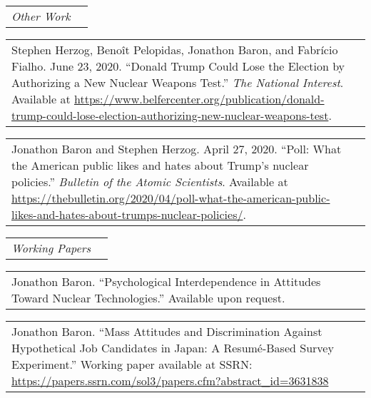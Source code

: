 \documentclass[11pt]{article}
\begin{document}
\vspace{0.13in}

\begin{tabular*}{7.1in}{p{6.925in}p{3cm}}
{\large {\emph{Other Work}}}
\end{tabular*} 
	
\vspace{0.13in}

\begin{tabular*}{7.1in}{p{6.925in}p{3cm}}
Stephen Herzog, Beno\^{i}t Pelopidas, Jonathon Baron, and Fabrício Fialho. June 23, 2020. ``Donald Trump Could Lose the Election by Authorizing a New Nuclear Weapons Test.'' \textit{The National Interest}. Available at \url{https://www.belfercenter.org/publication/donald-trump-could-lose-election-authorizing-new-nuclear-weapons-test}.
\end{tabular*}

\vspace{0.13in}

\begin{tabular*}{7.1in}{p{6.925in}p{3cm}}
Jonathon Baron and Stephen Herzog. April 27, 2020. ``Poll: What the American public likes and hates about Trump's nuclear policies.'' \textit{Bulletin of the Atomic Scientists}. Available at \url{https://thebulletin.org/2020/04/poll-what-the-american-public-likes-and-hates-about-trumps-nuclear-policies/}.
\end{tabular*}

\vspace{0.13in}

\begin{tabular*}{7.1in}{p{6.925in}p{3cm}}
{\large {\emph{Working Papers}}}
\end{tabular*} 

\vspace{0.13in}
\begin{tabular*}{7.1in}{p{6.925in}p{3cm}}
Jonathon Baron. ``Psychological Interdependence in Attitudes Toward Nuclear Technologies.'' Available upon request.
\end{tabular*}

\vspace{0.13in}

\begin{tabular*}{7.1in}{p{6.925in}p{3cm}}
Jonathon Baron. ``Mass Attitudes and Discrimination Against Hypothetical Job Candidates in Japan: A Resum\'{e}-Based Survey Experiment.'' Working paper available at SSRN: \url{https://papers.ssrn.com/sol3/papers.cfm?abstract_id=3631838}
\end{tabular*}
\end{document}
